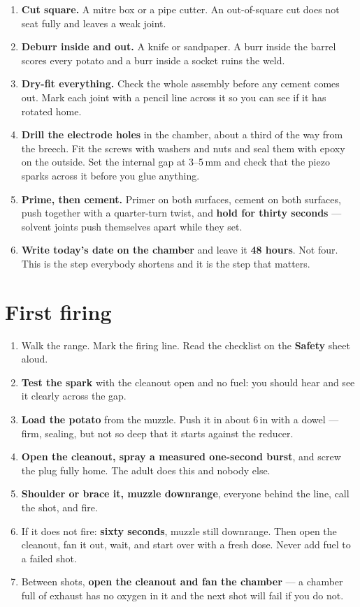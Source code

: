 \begin{enumerate}
\item \textbf{Cut square.} A mitre box or a pipe cutter. An out-of-square cut does not seat fully and leaves a weak joint.
\item \textbf{Deburr inside and out.} A knife or sandpaper. A burr inside the barrel scores every potato and a burr inside a socket ruins the weld.
\item \textbf{Dry-fit everything.} Check the whole assembly before any cement comes out. Mark each joint with a pencil line across it so you can see if it has rotated home.
\item \textbf{Drill the electrode holes} in the chamber, about a third of the way from the breech. Fit the screws with washers and nuts and seal them with epoxy on the outside. Set the internal gap at 3--5\,mm and check that the piezo sparks across it before you glue anything.
\item \textbf{Prime, then cement.} Primer on both surfaces, cement on both surfaces, push together with a quarter-turn twist, and \textbf{hold for thirty seconds} --- solvent joints push themselves apart while they set.
\item \textbf{Write today's date on the chamber} and leave it \textbf{48 hours}. Not four. This is the step everybody shortens and it is the step that matters.
\end{enumerate}

\section{First firing}
\begin{enumerate}
\item Walk the range. Mark the firing line. Read the checklist on the \textbf{Safety} sheet aloud.
\item \textbf{Test the spark} with the cleanout open and no fuel: you should hear and see it clearly across the gap.
\item \textbf{Load the potato} from the muzzle. Push it in about 6\,in with a dowel --- firm, sealing, but not so deep that it starts against the reducer.
\item \textbf{Open the cleanout, spray a measured one-second burst}, and screw the plug fully home. The adult does this and nobody else.
\item \textbf{Shoulder or brace it, muzzle downrange}, everyone behind the line, call the shot, and fire.
\item If it does not fire: \textbf{sixty seconds}, muzzle still downrange. Then open the cleanout, fan it out, wait, and start over with a fresh dose. Never add fuel to a failed shot.
\item Between shots, \textbf{open the cleanout and fan the chamber} --- a chamber full of exhaust has no oxygen in it and the next shot will fail if you do not.
\end{enumerate}

